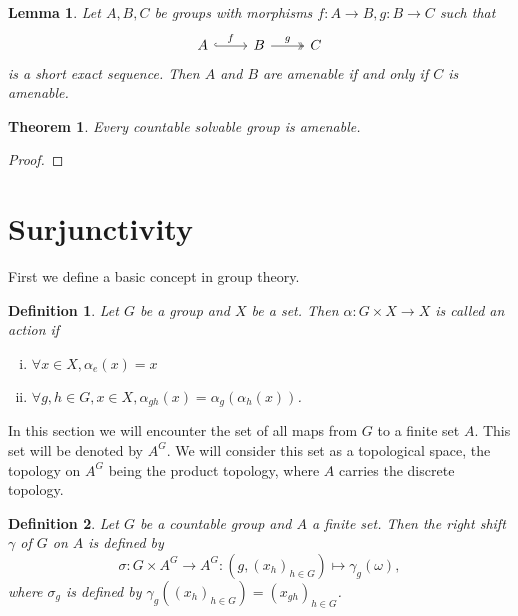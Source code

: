 \documentclass[a4paper]{report}
\newtheorem{theorem}{Theorem}
\newtheorem{definition}{Definition}
\newtheorem{lemma}{Lemma}
\begin{document}
    \begin{lemma}
        \label{lem:amenable_short_exact_sequence}
        Let $A, B, C$ be groups with morphisms $f:A\to B, g:B\to C$ such that
        \[\begin{tikzcd}
            A \arrow[r, "f", hook] & B \arrow[r, "g", two heads] & C
        \end{tikzcd}\] is a short exact sequence. Then $A$ and $B$ are amenable if and only if $C$ is amenable.
    \end{lemma}
    \begin{theorem}
        Every countable solvable group is amenable. 
    \end{theorem}
    \begin{proof}
        
    \end{proof}

    \section{Surjunctivity}

    First we define a basic concept in group theory.

    \begin{definition} %
        Let $G$ be a group and $X$ be a set. Then $\alpha: G \times X \to X$ is called an action if
        \begin{enumerate}[(i)]
            \item $\forall x \in X, \alpha_e(x) = x$
            \item $\forall g,h \in G, x\in X, \alpha_{gh}(x) = \alpha_g(\alpha_h(x))$.
        \end{enumerate}
    \end{definition}

    In this section we will encounter the set of all maps from $G$ to a finite set $A$. This set will be denoted by $A^G$. We will consider this set as a topological space, the topology on $A^G$ being the product topology, where $A$ carries the discrete topology.

    \begin{definition}
        Let $G$ be a countable group and $A$ a finite set. Then the right shift $\gamma$ of $G$ on $A$ is defined by
        \[
        \sigma: G \times A^G \to A^G: \left(g, (x_{h})_{h \in G} \right) \mapsto \gamma_g(\omega),
        \]
        where $\sigma_g$ is defined by $\gamma_g\left( (x_{h})_{h \in G} \right) = \left( x_{gh} \right)_{h \in G}$. %
    \end{definition}
\end{document}
